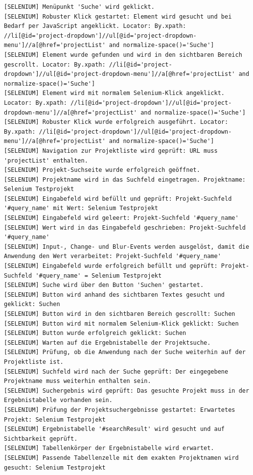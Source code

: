 \begin{lstlisting}[caption={Selenium -- Neue Activity (Erfolgreich)}, label={lst:sel_new_act_ok}, style=logStyle]
[SELENIUM] Menüpunkt 'Suche' wird geklickt.
[SELENIUM] Robuster Klick gestartet: Element wird gesucht und bei Bedarf per JavaScript angeklickt. Locator: By.xpath: //li[@id='project-dropdown']//ul[@id='project-dropdown-menu']//a[@href='projectList' and normalize-space()='Suche']
[SELENIUM] Element wurde gefunden und wird in den sichtbaren Bereich gescrollt. Locator: By.xpath: //li[@id='project-dropdown']//ul[@id='project-dropdown-menu']//a[@href='projectList' and normalize-space()='Suche']
[SELENIUM] Element wird mit normalem Selenium-Klick angeklickt. Locator: By.xpath: //li[@id='project-dropdown']//ul[@id='project-dropdown-menu']//a[@href='projectList' and normalize-space()='Suche']
[SELENIUM] Robuster Klick wurde erfolgreich ausgeführt. Locator: By.xpath: //li[@id='project-dropdown']//ul[@id='project-dropdown-menu']//a[@href='projectList' and normalize-space()='Suche']
[SELENIUM] Navigation zur Projektliste wird geprüft: URL muss 'projectList' enthalten.
[SELENIUM] Projekt-Suchseite wurde erfolgreich geöffnet.
[SELENIUM] Projektname wird in das Suchfeld eingetragen. Projektname: Selenium Testprojekt
[SELENIUM] Eingabefeld wird befüllt und geprüft: Projekt-Suchfeld '#query_name' mit Wert: Selenium Testprojekt
[SELENIUM] Eingabefeld wird geleert: Projekt-Suchfeld '#query_name'
[SELENIUM] Wert wird in das Eingabefeld geschrieben: Projekt-Suchfeld '#query_name'
[SELENIUM] Input-, Change- und Blur-Events werden ausgelöst, damit die Anwendung den Wert verarbeitet: Projekt-Suchfeld '#query_name'
[SELENIUM] Eingabefeld wurde erfolgreich befüllt und geprüft: Projekt-Suchfeld '#query_name' = Selenium Testprojekt
[SELENIUM] Suche wird über den Button 'Suchen' gestartet.
[SELENIUM] Button wird anhand des sichtbaren Textes gesucht und geklickt: Suchen
[SELENIUM] Button wird in den sichtbaren Bereich gescrollt: Suchen
[SELENIUM] Button wird mit normalem Selenium-Klick geklickt: Suchen
[SELENIUM] Button wurde erfolgreich geklickt: Suchen
[SELENIUM] Warten auf die Ergebnistabelle der Projektsuche.
[SELENIUM] Prüfung, ob die Anwendung nach der Suche weiterhin auf der Projektliste ist.
[SELENIUM] Suchfeld wird nach der Suche geprüft: Der eingegebene Projektname muss weiterhin enthalten sein.
[SELENIUM] Suchergebnis wird geprüft: Das gesuchte Projekt muss in der Ergebnistabelle vorhanden sein.
[SELENIUM] Prüfung der Projektsuchergebnisse gestartet: Erwartetes Projekt: Selenium Testprojekt
[SELENIUM] Ergebnistabelle '#searchResult' wird gesucht und auf Sichtbarkeit geprüft.
[SELENIUM] Tabellenkörper der Ergebnistabelle wird erwartet.
[SELENIUM] Passende Tabellenzelle mit dem exakten Projektnamen wird gesucht: Selenium Testprojekt

\end{lstlisting}
